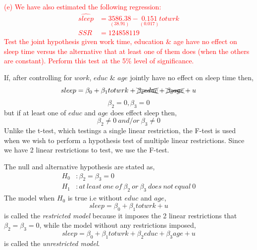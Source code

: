 \documentclass[12pt]{report}
\begin{document}
\noindent \textcolor{red}{(e) We have also estimated the following regression: \begin{align}
	\widehat{sleep} &= \underset{(38.91)}{3586.38} - \underset{(0.017)}{0.151}totwrk \\
	SSR &= 124858119 \nonumber
	\end{align} Test the joint hypothesis given work time, education \& age have no effect on sleep time versus the alternative that at least one of them does (when the others are constant). Perform this test at the 5\% level of significance.}

\noindent \noindent If, after controlling for $work$, $educ$ \& $age$ jointly have no effect on sleep time then,
$$sleep = \beta_0 + \beta_1 totwrk + \xcancel{\beta_2 educ} + \xcancel{\beta_3 age} + u$$
$$\beta_2 = 0, \beta_3 = 0$$ 
\noindent but if at least one of $educ$ and $age$ does effect sleep then,
$$\beta_2 \neq 0\ and/or\ \beta_3 \neq 0$$ Unlike the t-test, which testings a single linear restriction, the F-test is used when we wish to perform a hypothesis test of multiple linear restrictions. Since we have 2 linear restrictions to test, we use the F-test.

\noindent The null and alternative hypothesis are stated as, \begin{align*}
	H_0&: \beta_2 = \beta_3 = 0 \\
	H_1&: at\ least\ one\ of\ \beta_2\ or\ \beta_3\ does\ not\ equal\ 0
\end{align*} The model when $H_0$ is true i.e without $educ$ and $age$, $$sleep = \beta_0 + \beta_1 totwrk + u$$ is called the \textit{restricted model} because it imposes the 2 linear restrictions that $\beta_2 = \beta_3 = 0$, while the model without any restrictions imposed, $$sleep = \beta_0 + \beta_1 totwrk + \beta_2 educ + \beta_3 age + u$$ is called the \textit{unrestricted model}.
\end{document}
